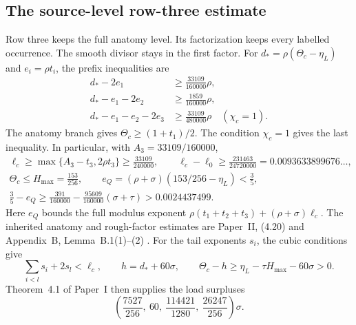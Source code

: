 \subsection{The source-level row-three estimate}\label{subsec:l3-source-row3}

Row three keeps the full anatomy level.
Its factorization keeps every labelled occurrence.
The smooth divisor stays in the first factor.
For $d_*=\rho(\Theta_c-\eta_L)$ and $e_i=\rho t_i$,
the prefix inequalities are
\begin{equation}\label{eq:l3-prefix-margins}
\begin{aligned}
 d_*-2e_1&\ge\frac{33109}{160000}\rho,\\
 d_*-e_1-2e_2&\ge\frac{1859}{160000}\rho,\\
 d_*-e_1-e_2-2e_3&\ge\frac{33109}{480000}\rho
                                      \quad(\chi_c=1).
\end{aligned}
\end{equation}
The anatomy branch gives $\Theta_c\ge(1+t_1)/2$.
The condition $\chi_c=1$ gives the last inequality.
In particular, with $A_3=33109/160000$,
\begin{equation}\label{eq:l3-row3-global-margins}
\begin{gathered}
 \ell_c\ge\max\{A_3-t_3,2\rho t_3\}\ge\frac{33109}{240000},\qquad
 \ell_c-\ell_0\ge\frac{231463}{24720000}=0.0093633899676\ldots,\\
 \Theta_c\le H_{\max}=\frac{153}{256},\qquad
 e_Q=(\rho+\sigma)(153/256-\eta_L)<\frac35,\\
 \frac35-e_Q\ge\frac{391}{160000}
       -\frac{95609}{160000}(\sigma+\tau)>0.0024437499.
\end{gathered}
\end{equation}
Here $e_Q$ bounds the full modulus exponent
$\rho(t_1+t_2+t_3)+(\rho+\sigma)\ell_c$.
The inherited anatomy and rough-factor estimates are Paper~II,
(4.20) and Appendix~B, Lemma~B.1(1)--(2)
\cite[(4.20), Appendix~B, Lemma~B.1(1)--(2)]{PaperII}.
For the tail exponents $s_i$, the cubic conditions give
\begin{equation}\label{eq:l3-tail-margins}
 \sum_{i<l}s_i+2s_l<\ell_c,\qquad
 h=d_*+60\sigma,\qquad
 \Theta_c-h\ge\eta_L-\tau H_{\max}-60\sigma>0.
\end{equation}
Theorem~4.1 of Paper~I then supplies the load surpluses
\begin{equation}\label{eq:l3-packing-loads}
 \left(\frac{7527}{256},\ 60,\ \frac{114421}{1280},\
                         \frac{26247}{256}\right)\sigma.
\end{equation}

